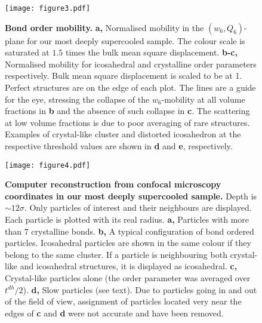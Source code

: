 \clearpage

\begin{figure}
\begin{center}
\texttt{[image: figure3.pdf]}
\end{center}
\caption{\textbf{Bond order mobility.} {\bf a,} Normalised mobility in the $(w_6, Q_6)$-plane for our most deeply supercooled sample. The colour scale is saturated at $1.5$ times the bulk mean square displacement. {\bf b-c,} Normalised mobility for icosahedral and crystalline order parameters respectively. Bulk mean square displacement is scaled to be at 1. Perfect structures are on the edge of each plot. The lines are a guide for the eye, stressing the collapse of the $w_6$-mobility at all volume fractions in {\bf b} and the absence of such collapse in {\bf c}. The scattering at low volume fractions is due to poor averaging of rare structures. Examples of crystal-like cluster and distorted icosahedron at the respective threshold values are shown in \textbf{d} and \textbf{e}, respectively.}
	\label{fig:msd_Q6_w6}
\end{figure}

\clearpage


\begin{figure}
\begin{center}
\texttt{[image: figure4.pdf]}
\end{center}
\caption{\textbf{Computer reconstruction from confocal microscopy coordinates in our most deeply supercooled sample.} Depth is $\sim 12\sigma$. Only particles of interest and their neighbours are displayed. Each particle is plotted with its real radius. \textbf{a,} Particles with more than $7$ crystalline bonds. \textbf{b,} A typical configuration of bond ordered particles. Icosahedral particles are shown in the same colour if they belong to the same cluster. If a particle is neighbouring both crystal-like and icosahedral structures, it is displayed as icosahedral. \textbf{c,} Crystal-like particles alone (the order parameter was averaged over $t^{dh}/2$). \textbf{d,} Slow particles (see text). Due to particles going in and out of the field of view, assignment of particles located very near the edges of \textbf{c} and \textbf{d} were not accurate and have been removed.}
	\label{fig:3D}
\end{figure}
\clearpage

